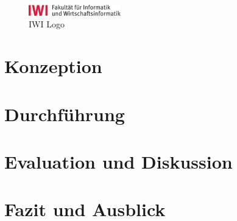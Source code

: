\documentclass[runningheads]{llncs}
\begin{document}
\begin{figure}[h]
  \centering
  \includegraphics[width=4cm]{IWI-HsKA_CMYK_V01}
  \caption{IWI Logo}
  \label{fig:iwilogo}
\end{figure}



\section{Konzeption}
\label{sec:Konzeption}


\section{Durchführung}
\label{sec:Durchführung}


\section{Evaluation und Diskussion}
\label{sec:Evaluation}



\section{Fazit und Ausblick}
\label{sec:Fazit}



%


\end{document}
